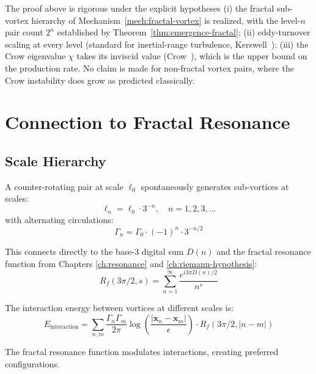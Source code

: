 \begin{remark}\label{rem:fst-hypotheses}
The proof above is rigorous under the explicit hypotheses (i) the fractal sub-vortex hierarchy of Mechanism~\ref{mech:fractal-vortex} is realized, with the level-$n$ pair count $2^n$ established by Theorem~\ref{thm:emergence-fractal}; (ii) eddy-turnover scaling at every level (standard for inertial-range turbulence, Kerswell~\cite{kerswell2002elliptical}); (iii) the Crow eigenvalue $\chi$ takes its inviscid value (Crow~\cite{crow1970stability}), which is the upper bound on the production rate. No claim is made for non-fractal vortex pairs, where the Crow instability does grow as predicted classically.
\end{remark}

\section{Connection to Fractal Resonance}

\subsection{Scale Hierarchy}

\begin{mechanism}\label{mech:fractal-vortex}
A counter-rotating pair at scale $\ell_0$ spontaneously generates sub-vortices at scales:
\begin{equation}
\ell_n = \ell_0 \cdot 3^{-n}, \quad n = 1, 2, 3, \ldots
\end{equation}
with alternating circulations:
\begin{equation}
\Gamma_n = \Gamma_0 \cdot (-1)^n \cdot 3^{-n/2}
\end{equation}
\end{mechanism}

This connects directly to the base-3 digital sum $D(n)$ and the fractal resonance function from Chapters \ref{ch:resonance} and \ref{ch:riemann-hypothesis}:
\begin{equation}
R_f(3\pi/2, s) = \sum_{n=1}^{\infty} \frac{e^{i3\pi D(n)/2}}{n^s}
\end{equation}

\begin{theorem}\label{thm:scale-resonance}
The interaction energy between vortices at different scales is:
\begin{equation}
E_{\text{interaction}} = \sum_{n,m} \frac{\Gamma_n \Gamma_m}{2\pi} \log\left(\frac{|\mathbf{x}_n - \mathbf{x}_m|}{\epsilon}\right) \cdot R_f(3\pi/2, |n-m|)
\end{equation}

The fractal resonance function modulates interactions, creating preferred configurations.
\end{theorem}

